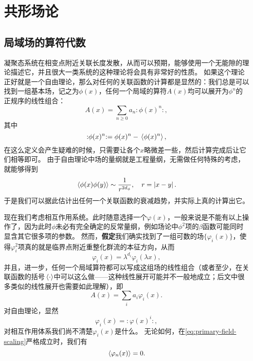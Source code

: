 \documentclass[hyperref, UTF8, a4paper]{ctexart}
\newcommand{\normord}[1]{\vcentcolon\mathrel{#1}\vcentcolon}
\providecommand{\vcentcolon}{\mathrel{\mathop{:}}}
\renewcommand{\emph}{\textbf}
\begin{document}
\section{共形场论}

\subsection{局域场的算符代数}

凝聚态系统在相变点附近关联长度发散，从而可以预期，能够使用一个无能隙的理论描述它，并且很大一类系统的这种理论将会具有非常好的性质。
如果这个理论正好就是一个自由理论，那么对任何的关联函数的计算都是显然的：我们总是可以找到一组基本场，记之为$\phi(x)$，任何一个局域的算符$A(x)$均可以展开为$\phi^n$的正规序的线性组合：
\begin{equation}
    A(x) = \sum_{n \geq 0} a_n \normord{\phi(x)^n},
\end{equation}
其中
\[
    \normord{\phi(x)^n} = \phi(x)^n - \expval*{\phi(x)^n},
\]
在这么定义会产生疑难的时候，只需要让各个$x$略微差一些，然后计算完成后让它们相等即可。
由于自由理论中场的量纲就是工程量纲，无需做任何特殊的考虑，就能够得到
\begin{equation}
    \expval*{\phi(x) \phi(y)} \sim \frac{1}{r^{2 d_\phi}}, \quad r = \abs*{x - y}.
\end{equation}
于是我们可以据此估计出任何一个关联函数的衰减趋势，并实际上真的计算出它。

现在我们考虑相互作用系统。此时随意选择一个$\varphi(x)$，一般来说是不能有以上操作了，因为此时$\phi$未必有完全确定的反常量纲，例如场论中$\phi^2$项的$\beta$函数可能同时显含其它很多项的参数。
然而，\emph{假定}我们确实找到了一组可数的场$\{\varphi_i(x)\}$，使得$\varphi_i^2$项真的就是临界点附近重整化群流的本征方向，从而
\begin{equation}
    \varphi_i(x) = \lambda^{d_i} \varphi_i(\lambda x),
    \label{eq:primary-field-scaling}
\end{equation}
并且，进一步，任何一个局域算符都可以写成这组场的线性组合（或者至少，在关联函数的括号$\expval*{\cdot}$中可以这么做——这种线性展开可能并不一般地成立；后文中很多类似的线性展开也需要如此理解），即
\begin{equation}
    A(x) = \sum_{i} a_i \varphi_i(x).
\end{equation}
对自由理论，显然
\begin{equation}
    \varphi_i(x) = \normord{\varphi(x)^i},
\end{equation}
对相互作用体系我们尚不清楚$\varphi_i(x)$是什么。
无论如何，在\eqref{eq:primary-field-scaling}严格成立时，我们有
\begin{equation}
    \expval*{\varphi_n(x)} = 0.
\end{equation}
\end{document}
